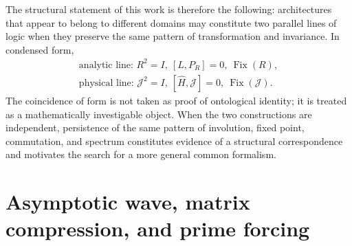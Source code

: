 \documentclass[11pt]{amsart}
\theoremstyle{definition}
\theoremstyle{remark}
\begin{document}
The structural statement of this work is therefore the following: architectures that appear to belong to different domains may constitute two parallel lines of logic when they preserve the same pattern of transformation and invariance. In condensed form,
\begin{equation}\label{eq:two-logic-lines}
 \boxed{
 \begin{array}{c}
 \text{analytic line: } R^2=I,\ [L,P_R]=0,\ \operatorname{Fix}(R),\\[1mm]
 \text{physical line: } \mathcal J^2=I,\ [\widehat H,\mathcal J]=0,\ \operatorname{Fix}(\mathcal J).
 \end{array}}
\end{equation}
The coincidence of form is not taken as proof of ontological identity; it is treated as a mathematically investigable object. When the two constructions are independent, persistence of the same pattern of involution, fixed point, commutation, and spectrum constitutes evidence of a structural correspondence and motivates the search for a more general common formalism.

\section{Asymptotic wave, matrix compression, and prime forcing}\label{sec:state-space}
\end{document}
